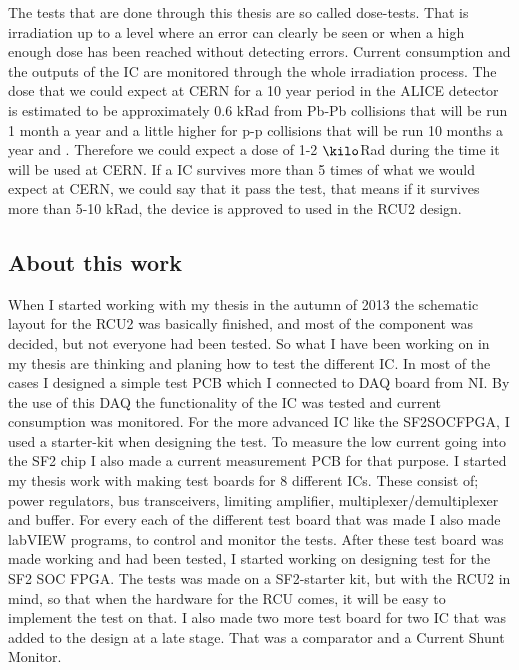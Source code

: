 \documentclass[12pt]{article}
\numberwithin{figure}{section}
\begin{document}
The tests that are done through this thesis are so called dose-tests. That is irradiation up to a level where an error can clearly be seen or when a high enough dose has been reached without detecting errors.
Current consumption and the outputs of the \ac{IC} are monitored through the whole irradiation process.
The dose that we could expect at \ac{CERN} for a 10 year period in the ALICE detector is estimated to be approximately 0.6 kRad from Pb-Pb collisions that will be run 1 month a year and a little higher for p-p collisions that will be run 10 months a year \cite{georgios} and \cite{roed}.
Therefore we could expect a dose of 1-2 $\kilo$Rad during the time it will be used at CERN.
If a \ac{IC} survives more than 5 times of what we would expect at \ac{CERN}, we could say that it pass the test, that means if it survives more than 5-10 kRad, the device is approved to used in the \ac{RCU2} design.


\subsection{About this work}
When I started working with my thesis in the autumn of 2013 the schematic layout for the \ac{RCU2} was basically finished, and most of the component was decided, but not everyone had been tested.
So what I have been working on in my thesis are thinking and planing how to test the different \ac{IC}.
In most of the cases I designed a simple test \ac{PCB} which I connected to \acf{DAQ} board from \ac{NI}. By the use of this \ac{DAQ} the functionality of the \ac{IC} was tested and current consumption was monitored.
For the more advanced \ac{IC} like the \ac{SF2}\acf{SOC}\ac{FPGA}, I used a starter-kit when designing the test. To measure the low current going into the \ac{SF2} chip I also made a current measurement \ac{PCB} for that purpose.
I started my thesis work with making test boards for 8 different \ac{IC}s. These consist of; power regulators, bus transceivers, limiting amplifier, multiplexer/demultiplexer and buffer.
For every each of the different test board that was made I also made labVIEW programs, to control and monitor the tests.
After these test board was made working and had been tested, I started working on designing test for the \ac{SF2} \ac{SOC} \ac{FPGA}.
The tests was made on a \ac{SF2}-starter kit, but with the \ac{RCU2} in mind, so that when the hardware for the \ac{RCU} comes, it will be easy to implement the test on that.
I also made two more test board for two IC that was added to the design at a late stage. That was a comparator and a Current Shunt Monitor.
\end{document}
